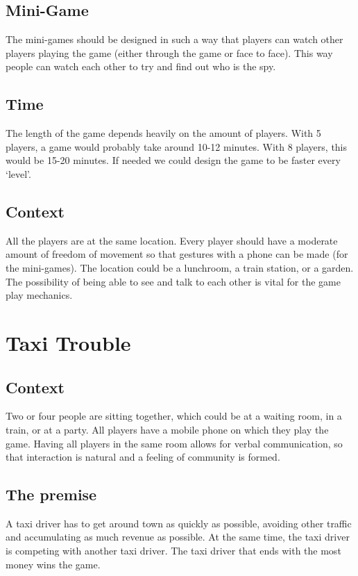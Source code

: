 \documentclass{article}
\begin{document}
\subsection*{Mini-Game} 
The mini-games should be designed in such a way that players can watch other players playing the game (either through the game or face to face). This way people can watch each other to try and find out who is the spy.

\subsection*{Time} 
The length of the game depends heavily on the amount of players. With 5 players, a game would probably take around 10-12 minutes. With 8 players, this would be 15-20 minutes. If needed we could design the game to be faster every `level'.

\subsection*{Context}
 All the players are at the same location. Every player should have a moderate amount of freedom of movement so that gestures with a phone can be made (for the mini-games). The location could be a lunchroom, a train station, or a garden. The possibility of being able to see and talk to each other is vital for the game play mechanics.   

 \section{Taxi Trouble}
 \subsection*{Context}
Two or four people are sitting together, which could be at a waiting room, in a train, or at a party. All players have a mobile phone on which they play the game. Having all players in the same room allows for verbal communication, so that interaction is natural and a feeling of community is formed.

\subsection*{The premise}
A taxi driver has to get around town as quickly as possible, avoiding other traffic and accumulating as much revenue as possible. At the same time, the taxi driver is competing with another taxi driver. The taxi driver that ends with the most money wins the game.
\end{document}
